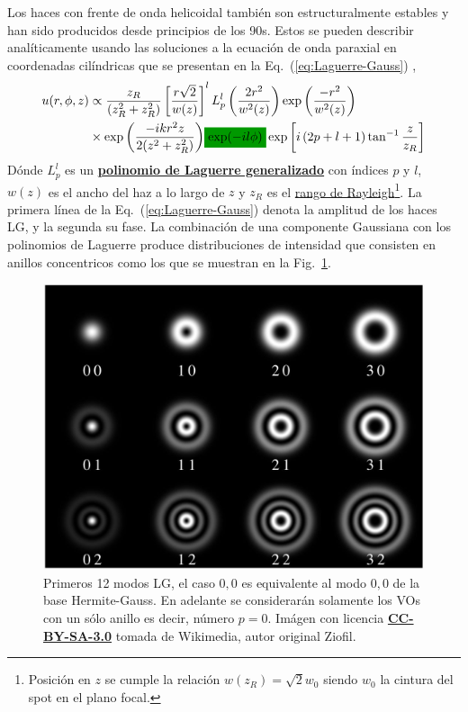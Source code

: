 Los haces con frente de onda helicoidal también son estructuralmente
estables y han sido producidos desde principios de los 90s. Estos se pueden describir
analíticamente usando las soluciones a la ecuación de onda paraxial en
coordenadas cilíndricas que se presentan en la Eq.~(\ref{eq:Laguerre-Gauss}) ,
\begin{align}
u(r,\phi,z) &\propto \frac{z_R}{(z_R^2+z_R^2)}
\left[\frac{r\sqrt{2}}{w(z)}\right]^lL_p^l\left(\frac{2r^2}{w^2(z)}
\right)\exp{\left(\frac{-r^2}{w^2(z)}\right)}\nonumber\\
&\times \exp{\left(\frac{-ikr^2z}{2(z^2+z_R^2)}\right)}
  \highlightG{\exp(-il\phi)}\exp{\left[i\left(2p+l+1\right)\tan^{-1}\frac{z}{z_R}\right]}
\label{eq:Laguerre-Gauss}
\end{align}
Dónde $L_p^l$ es un \href{http://en.wikipedia.org/wiki/Laguerre_polynomials}{\textbf{polinomio de Laguerre generalizado}} con índices $p$
y $l$, $w(z)$ es el ancho del haz a lo largo de $z$ y
$z_R$ es el
\href{http://www.rp-photonics.com/rayleigh_length.html}{rango de
  Rayleigh}\footnote{Posición en $z$ se cumple la relación $w(z_R)=\sqrt{2}w_0$
  siendo $w_0$ la cintura del spot en el plano focal.}.
La primera línea de la Eq.~(\ref{eq:Laguerre-Gauss}) denota la
amplitud de los haces LG, y la segunda su fase. La combinación de una
componente Gaussiana con los polinomios de Laguerre produce
distribuciones de intensidad que consisten en anillos concentricos
como los que se muestran en la
Fig.~\ref{fig:LG_intensities}.
\begin{figure}
\centering
\includegraphics[scale=0.25]{LG-wiki.jpg}
\caption[Primeros
  12 modos LG]{Primeros
  12 modos LG, el caso $0,0$ es equivalente al modo $0,0$ de la base
  Hermite-Gauss. En adelante se considerarán solamente los VOs con un
  sólo anillo es decir, número $p=0$. Imágen con licencia
  \href{https://creativecommons.org/licenses/by-sa/3.0/}{\textbf{CC-BY-SA-3.0}}
    tomada de Wikimedia, autor original Ziofil.} 
\label{fig:LG_intensities}
\end{figure}

